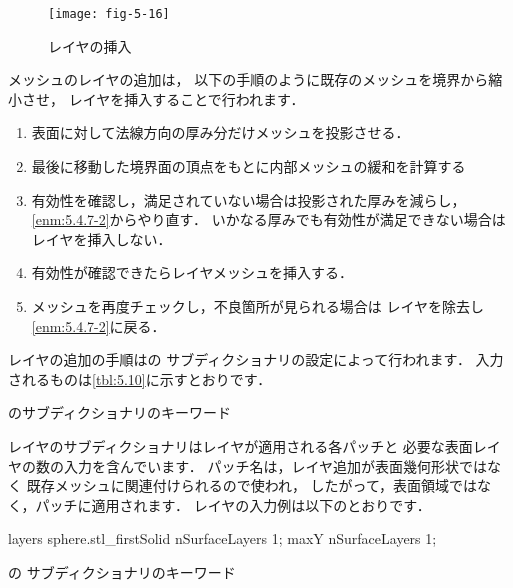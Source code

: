 \begin{figure}[ht]
 \texttt{[image: fig-5-16]}
 \caption{レイヤの挿入}
 \label{fig:5.16}
\end{figure}


メッシュのレイヤの追加は，
以下の手順のように既存のメッシュを境界から縮小させ，
レイヤを挿入することで行われます．
\begin{enumerate}
 \item 表面に対して法線方向の厚み分だけメッシュを投影させる．
 \item\label{enm:5.4.7-2}
      最後に移動した境界面の頂点をもとに内部メッシュの緩和を計算する
 \item 有効性を確認し，満足されていない場合は投影された厚みを減らし，
       \ref{enm:5.4.7-2}からやり直す．
       いかなる厚みでも有効性が満足できない場合はレイヤを挿入しない．
 \item 有効性が確認できたらレイヤメッシュを挿入する．
 \item メッシュを再度チェックし，不良箇所が見られる場合は
       レイヤを除去し\ref{enm:5.4.7-2}に戻る．
\end{enumerate}

レイヤの追加の手順はの
サブディクショナリの設定によって行われます．
入力されるものは\autoref{tbl:5.10}に示すとおりです．


\begin{table}[ht]
 
 \caption{のサブディクショナリのキーワード}
 \label{tbl:5.10}
\end{table}


レイヤのサブディクショナリはレイヤが適用される各パッチと
必要な表面レイヤの数の入力を含んでいます．
パッチ名は，レイヤ追加が表面幾何形状ではなく
既存メッシュに関連付けられるので使われ，
したがって，表面領域ではなく，パッチに適用されます．
レイヤの入力例は以下のとおりです．
\begin{OFverbatim}[file]
 layers
  {
      sphere.stl_firstSolid
      {
          nSurfaceLayers 1;
      }
      maxY
      {
          nSurfaceLayers 1;
      }
  }
\end{OFverbatim}


\begin{table}[ht]
 
 \caption{の
 サブディクショナリのキーワード}
 \label{tbl:5.11}
\end{table}


